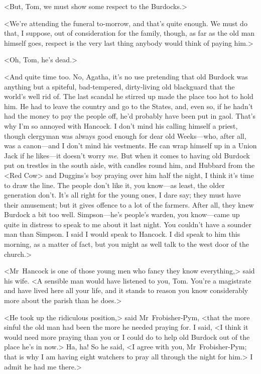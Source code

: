 <But, Tom, we must show some respect to the Burdocks.>

<We're attending the funeral to-morrow, and that's quite enough. We must do that, I suppose, out of consideration for the family, though, as far as the old man himself goes, respect is the very last thing anybody would think of paying him.>

<Oh, Tom, he's dead.>

<And quite time too. No, Agatha, it's no use pretending that old Burdock was anything but a spiteful, bad-tempered, dirty-living old blackguard that the world's well rid of. The last scandal he stirred up made the place too hot to hold him. He had to leave the country and go to the States, and, even so, if he hadn't had the money to pay the people off, he'd probably have been put in gaol. That's why I'm so annoyed with Hancock. I don't mind his calling himself a priest, though clergyman was always good enough for dear old Weeks—who, after all, was a canon—and I don't mind his vestments. He can wrap himself up in a Union Jack if he likes—it doesn't worry \textit{me}. But when it comes to having old Burdock put on trestles in the south aisle, with candles round him, and Hubbard from the <Red Cow> and Duggins's boy praying over him half the night, I think it's time to draw the line. The people don't like it, you know—as least, the older generation don't. It's all right for the young ones, I dare say; they must have their amusement; but it gives offence to a lot of the farmers. After all, they knew Burdock a bit too well. Simpson—he's people's warden, you know—came up quite in distress to speak to me about it last night. You couldn't have a sounder man than Simpson. I said I would speak to Hancock. I did speak to him this morning, as a matter of fact, but you might as well talk to the west door of the church.>

<Mr~Hancock is one of those young men who fancy they know everything,> said his wife. <A sensible man would have listened to you, Tom. You're a magistrate and have lived here all your life, and it stands to reason you know considerably more about the parish than he does.>

<He took up the ridiculous position,> said Mr~Frobisher-Pym, <that the more sinful the old man had been the more he needed praying for. I said, <I think it would need more praying than you or I could do to help old Burdock out of the place he's in now.> Ha, ha! So he said, <I agree with you, Mr~Frobisher-Pym; that is why I am having eight watchers to pray all through the night for him.> I admit he had me there.>

